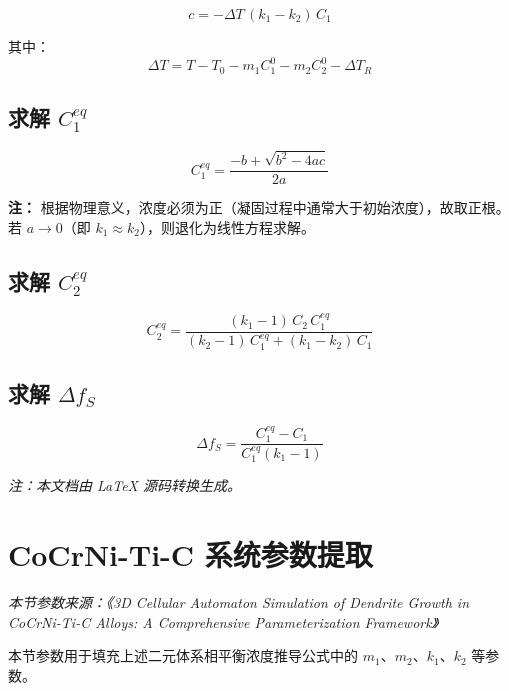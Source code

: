 \documentclass[12pt, a4paper]{article}
\begin{document}
\begin{equation}
  c = -\Delta T\,(k_1-k_2)\,C_1
  \label{eq:coef_c}
\end{equation}

其中：
\[
  \Delta T = T - T_0 - m_1 C_1^0 - m_2 C_2^0 - \Delta T_R
\]

\subsection{求解 $C_1^{eq}$}

\begin{equation}
  C_1^{eq} = \frac{-b + \sqrt{b^2 - 4ac}}{2a}
  \label{eq:C1eq}
\end{equation}

\textbf{注：} 根据物理意义，浓度必须为正（凝固过程中通常大于初始浓度），故取正根。若 $a \to 0$（即 $k_1 \approx k_2$），则退化为线性方程求解。

\subsection{求解 $C_2^{eq}$}

\begin{equation}
  C_2^{eq} = \frac{(k_1-1)\,C_2\,C_1^{eq}}{(k_2-1)\,C_1^{eq} + (k_1-k_2)\,C_1}
  \label{eq:C2eq_final}
\end{equation}

\subsection{求解 $\Delta f_S$}

\begin{equation}
  \Delta f_S = \frac{C_1^{eq} - C_1}{C_1^{eq}(k_1-1)}
  \label{eq:DeltaFS}
\end{equation}

\bigskip
\noindent\textit{注：本文档由 LaTeX 源码转换生成。}

\newpage
\section{CoCrNi-Ti-C 系统参数提取}

\textit{本节参数来源：《3D Cellular Automaton Simulation of Dendrite Growth in CoCrNi-Ti-C Alloys: A Comprehensive Parameterization Framework》}

本节参数用于填充上述二元体系相平衡浓度推导公式中的 $m_1$、$m_2$、$k_1$、$k_2$ 等参数。
\end{document}
